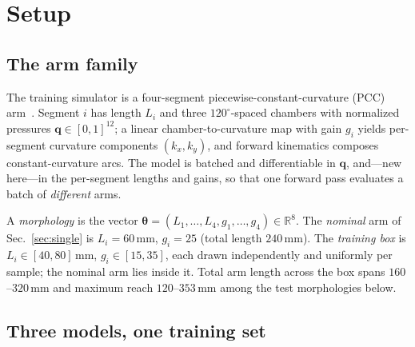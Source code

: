 \documentclass[robotics,article,submit,moreauthors]{Definitions/mdpi}
\begin{document}
\section{Setup}
\label{sec:setup}

\subsection{The arm family}

The training simulator is a four-segment piecewise-constant-curvature (PCC)
arm~\cite{webster2010design}. Segment $i$ has length $L_i$ and three
$120^\circ$-spaced chambers with normalized pressures
$\mathbf{q}\in[0,1]^{12}$; a linear chamber-to-curvature map with gain
$g_i$ yields per-segment curvature components $(k_x,k_y)$, and forward
kinematics composes constant-curvature arcs. The model is batched and
differentiable in $\mathbf{q}$, and---new here---in the per-segment
lengths and gains, so that one forward pass evaluates a batch of
\emph{different} arms.

A \emph{morphology} is the vector
$\boldsymbol{\theta}=(L_1,\dots,L_4,g_1,\dots,g_4)\in\mathbb{R}^8$. The
\emph{nominal} arm of Sec.~\ref{sec:single} is $L_i=60\,$mm, $g_i=25$ (total
length $240\,$mm). The \emph{training box} is
$L_i\in[40,80]\,$mm, $g_i\in[15,35]$, each drawn independently and
uniformly per sample; the nominal arm lies inside it. Total arm length
across the box spans $160$--$320\,$mm and maximum reach $120$--$353\,$mm
among the test morphologies below.

\subsection{Three models, one training set}
\label{sec:design}
\end{document}
